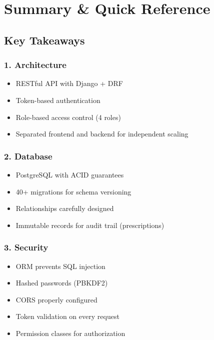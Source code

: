 \documentclass[11pt,a4paper,twoside]{report}
\begin{document}
\newpage

\chapter*{Summary \& Quick Reference}

\section*{Key Takeaways}

\subsection*{1. Architecture}
\begin{itemize}
    \item RESTful API with Django + DRF
    \item Token-based authentication
    \item Role-based access control (4 roles)
    \item Separated frontend and backend for independent scaling
\end{itemize}

\subsection*{2. Database}
\begin{itemize}
    \item PostgreSQL with ACID guarantees
    \item 40+ migrations for schema versioning
    \item Relationships carefully designed
    \item Immutable records for audit trail (prescriptions)
\end{itemize}

\subsection*{3. Security}
\begin{itemize}
    \item ORM prevents SQL injection
    \item Hashed passwords (PBKDF2)
    \item CORS properly configured
    \item Token validation on every request
    \item Permission classes for authorization
\end{itemize}
\end{document}
